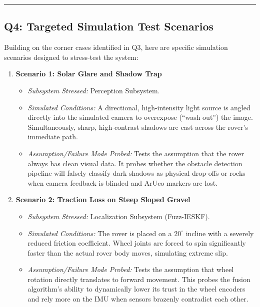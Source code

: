 \documentclass[12pt,a4paper]{article}
\begin{document}
\vspace{0.3em}
\noindent\rule{\textwidth}{0.4pt}
\vspace{0.3em}

\subsection{Q4: Targeted Simulation Test Scenarios}

Building on the corner cases identified in Q3, here are specific simulation scenarios designed to stress-test the system:

\begin{enumerate}[leftmargin=*]
    \item \textbf{Scenario 1: Solar Glare and Shadow Trap}
    \begin{itemize}
        \item \textit{Subsystem Stressed:} Perception Subsystem.
        \item \textit{Simulated Conditions:} A directional, high-intensity light source is angled directly into the simulated camera to overexpose (``wash out'') the image. Simultaneously, sharp, high-contrast shadows are cast across the rover's immediate path.
        \item \textit{Assumption/Failure Mode Probed:} Tests the assumption that the rover always has clean visual data. It probes whether the obstacle detection pipeline will falsely classify dark shadows as physical drop-offs or rocks when camera feedback is blinded and ArUco markers are lost.
    \end{itemize}

    \item \textbf{Scenario 2: Traction Loss on Steep Sloped Gravel}
    \begin{itemize}
        \item \textit{Subsystem Stressed:} Localization Subsystem (Fuzz-IESKF).
        \item \textit{Simulated Conditions:} The rover is placed on a $20^\circ$ incline with a severely reduced friction coefficient. Wheel joints are forced to spin significantly faster than the actual rover body moves, simulating extreme slip.
        \item \textit{Assumption/Failure Mode Probed:} Tests the assumption that wheel rotation directly translates to forward movement. This probes the fusion algorithm's ability to dynamically lower its trust in the wheel encoders and rely more on the IMU when sensors brazenly contradict each other.
    \end{itemize}


\end{enumerate}
\end{document}
